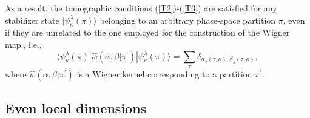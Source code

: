\documentclass{article}
\begin{document}
As a result, the tomographic conditions (\ref{T2})-(\ref{T3}) are satisfied
for any stabilizer state $|\psi _{\kappa }^{\lambda }(\pi )\rangle $
belonging to an arbitrary phase-space partition $\pi $, even if they are
unrelated to the one employed for the construction of the Wigner map., i.e.,%
\begin{equation*}
\langle \psi _{\kappa }^{\lambda }(\pi )|\hat{w}\left( \alpha ,\beta |\pi
^{\prime }\right) |\psi _{\kappa }^{\lambda }(\pi )\rangle =\sum_{\tau
}\delta _{\alpha _{\lambda }(\tau ,\kappa ),\beta _{\lambda }(\tau ,\kappa
)},
\end{equation*}%
where $\hat{w}\left( \alpha ,\beta |\pi ^{\prime }\right) $ is a Wigner
kernel corresponding to a partition $\pi ^{\prime }$.

\subsection{Even local dimensions}
\end{document}
